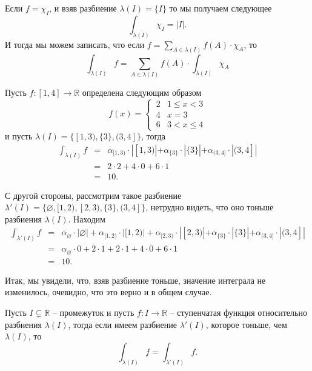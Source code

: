 \begin{remark}\label{int_via_chi}
    Если $f = \chi_I$, и взяв разбиение $\lambda(I) = \{I\}$ то мы получаем следующее
    \[
     \int_{\lambda(I)}\chi_I = |I|.
    \]
И тогда мы можем записать, что если $f = \sum_{A \in \lambda(I)}f(A) \cdot \chi_A$, то
\[
\boxed{
 \int_{\lambda(I)}f = \sum_{A \in \lambda(I)} f(A) \cdot \int_{\lambda(I)}\chi_A
 }
\]
\end{remark}


\begin{example}\label{int_[1,4]=10}
    Пусть $f: [1,4] \to \mathbb{R}$ определена следующим образом
    \[
     f(x)  = \begin{cases}
          \, 2 & 1 \le x <3 \\
          \, 4 & x = 3 \\
          \, 6 & 3< x \le 4
     \end{cases}
    \]
    и пусть $\lambda(I) = \{ [1,3), \{3\}, (3,4] \}$, тогда
 \begin{eqnarray*}
  \int_{\lambda(I)} f  &=& \alpha_{[1,3)}\cdot | [1,3) | + \alpha_{\{3\}}\cdot |\{3\}| + \alpha_{(3,4]} \cdot | (3,4] | \\
  &=& 2 \cdot 2 + 4 \cdot 0 + 6 \cdot 1 \\
  &=& 10.
 \end{eqnarray*}

 С другой стороны, рассмотрим такое разбиение $\lambda'(I) = \{ \varnothing, [1,2), [2,3), \{3\}, (3,4] \}$, нетрудно видеть, что оно тоньше разбиения $\lambda(I)$. Находим
 \begin{eqnarray*}
     \int_{\lambda'(I)}f &=&\alpha_\varnothing \cdot |\varnothing| + \alpha_{[1,2)} \cdot | [1,2) | + \alpha_{[2,3)} \cdot |[2,3)| + \alpha_{\{3\}}\cdot |\{3\}| + \alpha_{(3,4]} \cdot | (3,4] | \\
     &=& \alpha_\varnothing \cdot 0 + 2 \cdot 1 + 2 \cdot 1 + 4 \cdot 0 + 6 \cdot 1 \\
     &=& 10.
 \end{eqnarray*}
 
\end{example}

Итак, мы увидели, что, взяв разбиение тоньше, значение интеграла не изменилось, очевидно, что это верно и в общем случае.

\begin{lemma}
  Пусть $I \subsetneq \mathbb{R}$ -- промежуток и пусть $f:I \to \mathbb{R}$ -- ступенчатая функция относительно разбиения $\lambda(I)$, тогда если имеем разбиение $\lambda'(I)$, которое тоньше, чем $\lambda(I)$, то
  \[
   \int_{\lambda(I)}f = \int_{\lambda'(I)}f.
  \]
\end{lemma}

